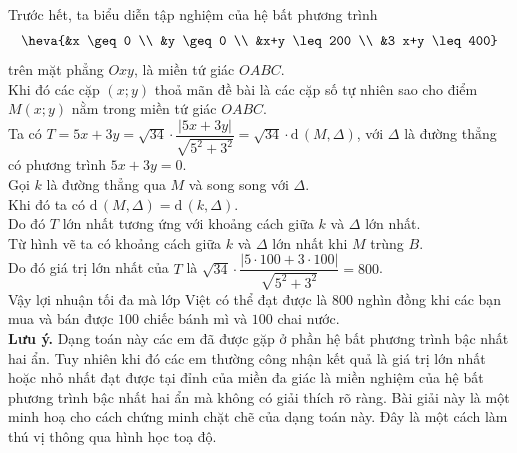 \begin{bt}
{{}
Trước hết, ta biểu diễn tập nghiệm của hệ bất phương trình
$$\heva{&x \geq 0 \\ &y \geq 0 \\ &x+y \leq 200 \\ &3 x+y \leq 400}$$
 trên mặt phẳng $O x y$, là miền tứ giác $O A B C$.\\
Khi đó các cặp $(x ; y)$ thoả mãn đề bài là các cặp số tự nhiên sao cho điểm $M(x ; y)$ nằm trong miền tứ giác $O A B C$.\\
Ta có $T=5 x+3 y=\sqrt{34} \cdot \dfrac{|5 x+3 y|}{\sqrt{5^{2}+3^{2}}}=\sqrt{34} \cdot \mathrm{d\,}(M, \Delta)$, với $\Delta$ là đường thẳng có phương trình $5 x+3 y=0$.\\
Gọi $k$ là đường thẳng qua $M$ và song song với $\Delta$. \\
Khi đó ta có $\mathrm{d\,}(M, \Delta)=\mathrm{d\,}(k, \Delta)$. \\
Do đó $T$ lớn nhất tương ứng với khoảng cách giữa $k$ và $\Delta$ lớn nhất. \\
Từ hình vẽ ta có khoảng cách giữa $k$ và $\Delta$ lớn nhất khi $M$ trùng $B$. \\
Do đó giá trị lớn nhất của $T$ là $\sqrt{34} \cdot \dfrac{|5 \cdot 100+3 \cdot 100|}{\sqrt{5^{2}+3^{2}}}=800$.\\
Vậy lợi nhuận tối đa mà lớp Việt có thể đạt được là $800$ nghìn đồng khi các bạn mua và bán được $100$ chiếc bánh mì và $100$ chai nước.\\
\textbf{Lưu ý.}  Dạng toán này các em đã được gặp ở phần hệ bất phương trình bậc nhất hai ẩn. Tuy nhiên khi đó các em thường công nhận kết quả là giá trị lớn nhất hoặc nhỏ nhất đạt được tại đỉnh của miền đa giác là miền nghiệm của hệ bất phương trình bậc nhất hai ẩn mà không có giải thích rõ ràng. Bài giải này là một minh hoạ cho cách chứng minh chặt chẽ của dạng toán này. Đây là một cách làm thú vị thông qua hình học toạ độ.
}
\end{bt}

